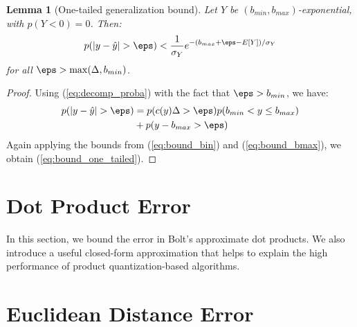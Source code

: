 \documentclass[]{article}
\newtheorem{lemma}{Lemma}[section]
\begin{document}
\begin{lemma}[One-tailed generalization bound] \label{thm:pac_quant_one_tail}
Let $Y$ be $(b_{min}, b_{max})$-exponential, with $p(Y < 0) = 0$. Then:
\begin{align} \label{eq:bound_one_tailed}
    p(|y - \hat{y}| > \eps) <
        \frac{1}{\sigma_Y} e^{-(b_{max} + \eps - E[Y]) / \sigma_Y}
\end{align}
for all $\eps > \max(\Delta, b_{min})$.
\end{lemma}

\begin{proof}
Using (\ref{eq:decomp_proba}) with the fact that $\eps > b_{min}$, we have:
\begin{align} \label{eq:decomp_proba}
    p(|y - \hat{y}| > \eps)
                            &= p(c(y)\Delta > \eps)p(b_{min} < y \le b_{max}) \\
                            &+ p(y - b_{max} > \eps) \nonumber
\end{align}
Again applying the bounds from (\ref{eq:bound_bin}) and (\ref{eq:bound_bmax}), we obtain (\ref{eq:bound_one_tailed}).
\end{proof}


\section{Dot Product Error}
In this section, we bound the error in Bolt's approximate dot products. We also introduce a useful closed-form approximation that helps to explain the high performance of product quantization-based algorithms.



\section{Euclidean Distance Error}
\end{document}
